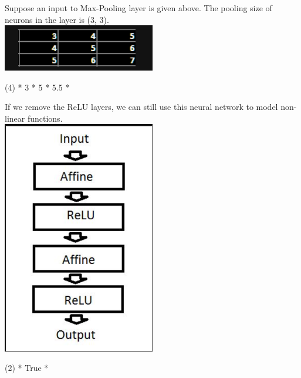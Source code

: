 \documentclass[10pt]{extarticle}
\begin{document}
\begin{exercise}
    Suppose an input to Max-Pooling layer is given above. The pooling size of neurons in the layer is (3, 3).\\

    \includegraphics[width=0.5\textwidth,height=.5\textwidth]{Q_table}

    \begin{choice} (4)
        * 3
        * 5
        * 5.5
        *
    \end{choice}
\end{exercise}
\begin{solution}
\end{solution}

\begin{exercise}
    If we remove the ReLU layers, we can still use this neural network to model non-linear functions.\\

    \includegraphics[width=0.5\textwidth,height=.5\textwidth]{nn_layer}
    \begin{choice} (2)
        * True
        *
    \end{choice}
\end{exercise}
\begin{solution}
\end{solution}
\end{document}

